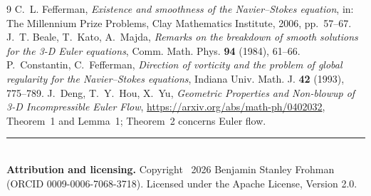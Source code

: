 \documentclass[11pt,a4paper]{article}
\begin{document}
\begin{thebibliography}{9}
 C.~L. Fefferman, \emph{Existence and smoothness of the Navier--Stokes equation}, in: The Millennium Prize Problems, Clay Mathematics Institute, 2006, pp.~57--67.
 J.~T. Beale, T.~Kato, A.~Majda, \emph{Remarks on the breakdown of smooth solutions for the 3-D Euler equations}, Comm. Math. Phys. \textbf{94} (1984), 61--66.
 P.~Constantin, C.~Fefferman, \emph{Direction of vorticity and the problem of global regularity for the Navier--Stokes equations}, Indiana Univ. Math. J. \textbf{42} (1993), 775--789.
 J.~Deng, T.~Y.~Hou, X.~Yu, \emph{Geometric Properties and Non-blowup of 3-D Incompressible Euler Flow}, \url{https://arxiv.org/abs/math-ph/0402032}, Theorem~1 and Lemma~1; Theorem~2 concerns Euler flow.
\end{thebibliography}

\vfill
\noindent\rule{\textwidth}{0.4pt}\\
\footnotesize
\textbf{Attribution and licensing.} Copyright \textcopyright\ 2026 Benjamin Stanley Frohman (ORCID 0009-0006-7068-3718).
Licensed under the Apache License, Version 2.0.
\end{document}
